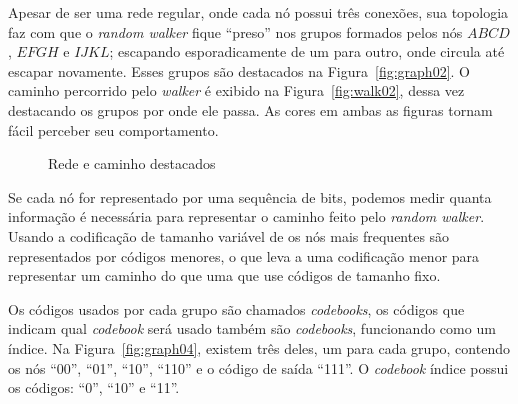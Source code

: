 \documentclass[12pt,a4paper]{article}
\begin{document}
Apesar de ser uma rede regular, onde cada nó possui três conexões, sua topologia faz com que o \textit{random walker} fique \enquote{preso} nos grupos formados pelos nós $ABCD$, $EFGH$ e $IJKL$; escapando esporadicamente de um para outro, onde circula até escapar novamente. Esses grupos são destacados na Figura~\ref{fig:graph02}. O caminho percorrido pelo \textit{walker} é exibido na Figura~\ref{fig:walk02}, dessa vez destacando os grupos por onde ele passa. As cores em ambas as figuras tornam fácil perceber seu comportamento.

\begin{figure}[ht]
    \centering
    \caption{Rede e caminho destacados}
\end{figure}

Se cada nó for representado por uma sequência de bits, podemos medir quanta informação é necessária para representar o caminho feito pelo \textit{random walker}. Usando a codificação de tamanho variável de   os nós mais frequentes são representados por códigos menores, o que leva a uma codificação menor para representar um caminho do que uma que use códigos de tamanho fixo.

Os códigos usados por cada grupo são chamados \textit{codebooks}, os códigos que indicam qual \textit{codebook} será usado também são \textit{codebooks}, funcionando como um índice. Na Figura~\ref{fig:graph04}, existem três deles, um para cada grupo, contendo os nós \enquote{00}, \enquote{01}, \enquote{10}, \enquote{110} e o código de saída \enquote{111}. O \textit{codebook} índice possui os códigos: \enquote{0}, \enquote{10} e \enquote{11}.
\end{document}
